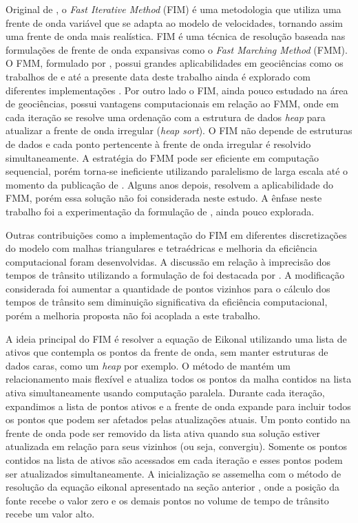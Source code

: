 Original de , o \textit{Fast Iterative Method} (FIM) é uma metodologia que utiliza uma frente de onda variável que se adapta ao modelo de velocidades, tornando assim uma frente de onda mais realística. FIM é uma técnica de resolução baseada nas formulações de frente de onda expansivas como o \textit{Fast Marching Method} (FMM). O FMM, formulado por , possui grandes aplicabilidades em geociências como os trabalhos de  e até a presente data deste trabalho ainda é explorado com diferentes implementações \cite{white2020pykonal, chenpyekfmm2023}. Por outro lado o FIM, ainda pouco estudado na área de geociências, possui vantagens computacionais em relação ao FMM, onde em cada iteração se resolve uma ordenação com a estrutura de dados \textit{heap} para atualizar a frente de onda irregular (\textit{heap sort}). O FIM não depende de estruturas de dados e cada ponto pertencente à frente de onda irregular é resolvido simultaneamente. A estratégia do FMM pode ser eficiente em computação sequencial, porém torna-se ineficiente utilizando paralelismo de larga escala até o momento da publicação de . Alguns anos depois,  resolvem a aplicabilidade do FMM, porém essa solução não foi considerada neste estudo. A ênfase neste trabalho foi a experimentação da formulação de , ainda pouco explorada. 

Outras contribuições como a implementação do FIM em diferentes discretizações do modelo com malhas triangulares e tetraédricas \cite{fu2011fast, fu2013fast} e melhoria da eficiência computacional \cite{dang2014fast, hong2016multi, hong2022mg} foram desenvolvidas. A discussão em relação à imprecisão dos tempos de trânsito utilizando a formulação de  foi destacada por . A modificação considerada foi aumentar a quantidade de pontos vizinhos para o cálculo dos tempos de trânsito sem diminuição significativa da eficiência computacional, porém a melhoria proposta não foi acoplada a este trabalho. 

A ideia principal do FIM é resolver a equação de Eikonal utilizando uma lista de ativos que contempla os pontos da frente de onda, sem manter estruturas de dados caras, como um \textit{heap} por exemplo. O método de  mantém um relacionamento mais flexível e atualiza todos os pontos da malha contidos na lista ativa simultaneamente usando computação paralela. Durante cada iteração, expandimos a lista de pontos ativos e a frente de onda expande para incluir todos os pontos que podem ser afetados pelas atualizações atuais.  Um ponto contido na frente de onda pode ser removido da lista ativa quando sua solução estiver atualizada em relação para seus vizinhos (ou seja, convergiu). Somente os pontos contidos na lista de ativos são acessados em cada iteração e esses pontos podem ser atualizados simultaneamente. A inicialização se assemelha com o método de resolução da equação eikonal apresentado na seção anterior \cite{podvin1991finite}, onde a posição da fonte recebe o valor zero e os demais pontos no volume de tempo de trânsito recebe um valor alto.

